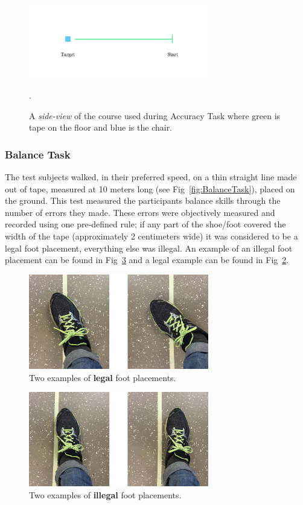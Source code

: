 \documentclass[runningheads,a4paper,oribibl]{llncs}
\begin{document}
\begin{figure}
   \centering
   \includegraphics[width=0.7\textwidth]{ExternalMaterial/AccuracyTask}
   \caption{A \emph{side-view} of the course used during Accuracy Task where green is tape on the floor and blue is the chair.}. \label{fig:AccuracyTask}
\end{figure}

\subsubsection{Balance Task}

The test subjects walked, in their preferred speed, on a thin straight line made out of tape, measured at 10 meters long (see Fig~\ref{fig:BalanceTask}), placed on the ground. This test measured the participants balance skills through the number of errors they made. These errors were objectively measured and recorded using one pre-defined rule; if any part of the shoe/foot covered the width of the tape (approximately 2 centimeters wide) it was considered to be a legal foot placement, everything else was illegal. An example of an illegal foot placement can be found in Fig~\ref{fig:Illegal} and a legal example can be found in Fig~\ref{fig:Legal}.

\begin{figure}
   \centering
   \includegraphics[width=0.7\textwidth]{ExternalMaterial/Legal}
   \caption{Two examples of \textbf{legal} foot placements.} \label{fig:Legal}
\end{figure}

\begin{figure}
   \centering
   \includegraphics[width=0.7\textwidth]{ExternalMaterial/Illegal}
   \caption{Two examples of \textbf{illegal} foot placements.} \label{fig:Illegal}
\end{figure}
\end{document}
